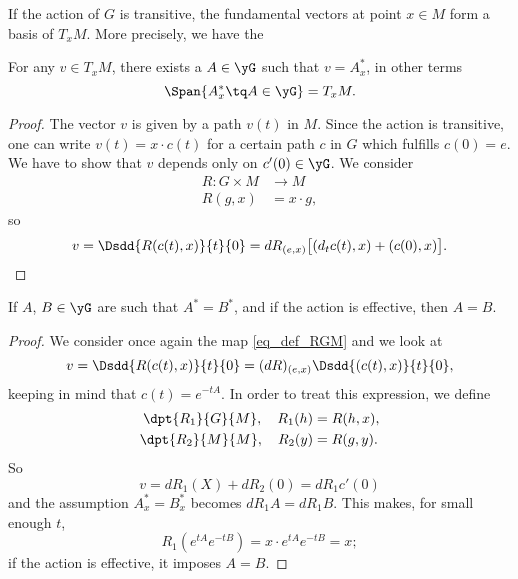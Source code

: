 If the action of $G$ is transitive, the fundamental vectors at point $x\in M$ form a basis of $T_xM$. More precisely, we have the

\begin{lemma}
For any $v\in T_xM$, there exists a $A\in\yG$ such that $v=A^*_x$, in other terms
\[
  \Span\{ A^*_{x}\tq A\in\yG \}=T_{x}M.
\]
\label{LemFundSpansTan}
\end{lemma}

\begin{proof}
The vector $v$ is given by a path $v(t)$ in $M$. Since the action is transitive, one can write $v(t)=x\cdot c(t)$ for a certain path $c$ in $G$ which fulfills $c(0)=e$. We have to show that $v$ depends only on $c'(0)\in\yG$. We consider
\begin{equation}  \label{eq_def_RGM}
\begin{aligned}
 R\colon G\times M&\to M \\
R(g,x)&= x\cdot g,
\end{aligned}
\end{equation}
so
\begin{equation}\label{eq:v_Rc}
   v=\Dsdd{ R(c(t),x) }{t}{0}=dR_{(e,x)}\big[  (d_tc(t),x)+(c(0),x)   \big].
\end{equation}

\end{proof}

\begin{lemma}\label{lem:As_Bs_A_B}
If $A$, $B\in\yG$ are such that $A^*=B^*$, and if the action is effective, then $A=B$.
\end{lemma}

\begin{proof}
 We consider once again the map \eqref{eq_def_RGM} and we look at
\[
  v=\Dsdd{ R(c(t),x) }{t}{0}
   =(dR)_{(e,x)}\Dsdd{ (c(t),x) }{t}{0},
\]
keeping in mind that $c(t)=e^{-tA}$. In order to treat this expression, we define
\begin{subequations}
\begin{align}
  \dpt{R_1}{G}{M},\quad  R_1(h)&=R(h,x),\\
  \dpt{R_2}{M}{M},\quad  R_2(y)&=R(g,y).
\end{align}
\end{subequations}
So
\[
  v=dR_1(X)+dR_2(0)=dR_1c'(0)
\]
and the assumption $A^*_x=B^*_x$ becomes $dR_1 A=dR_1 B$. This makes, for small enough $t$, 
\begin{equation}
    R_1(e^{tA}e^{-tB})=x\cdot e^{tA}e^{-tB}=x; 
\end{equation}
if the action is effective, it imposes $A=B$.
\end{proof}

